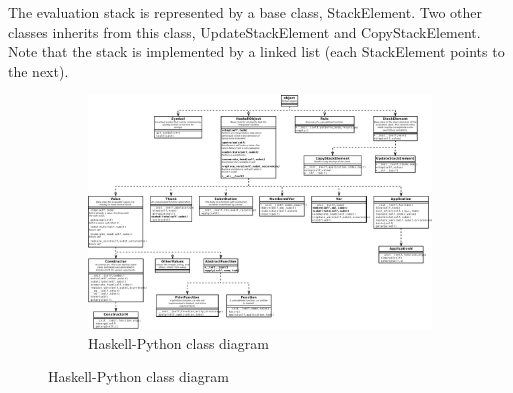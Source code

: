 The evaluation stack is represented by a base class, StackElement. Two other
classes inherits from this class, UpdateStackElement and CopyStackElement. Note that
the stack is implemented by a linked list (each StackElement points to the next).


\begin{figure}
\begin{figure}[H]
\centering
\includegraphics[angle=270, width=\textheight]{../diags/core-interp.pdf}

\caption{Haskell-Python class diagram}
\label{fig:classdia}

\end{figure}
\end{figure}
